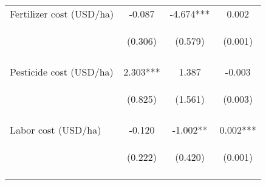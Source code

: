 \begin{center}
\begin{tabular}{lccc}
Fertilizer cost (USD/ha) & -0.087 & -4.674*** & 0.002 \\
 & \begin{footnotesize}(0.306)\end{footnotesize} & \begin{footnotesize}(0.579)\end{footnotesize} & \begin{footnotesize}(0.001)\end{footnotesize} \\
\vspace{4pt} & \begin{footnotesize}[0.777]\end{footnotesize} & \begin{footnotesize}[0.000]\end{footnotesize} & \begin{footnotesize}[0.105]\end{footnotesize} \\
Pesticide cost (USD/ha) & 2.303*** & 1.387 & -0.003 \\
 & \begin{footnotesize}(0.825)\end{footnotesize} & \begin{footnotesize}(1.561)\end{footnotesize} & \begin{footnotesize}(0.003)\end{footnotesize} \\
\vspace{4pt} & \begin{footnotesize}[0.005]\end{footnotesize} & \begin{footnotesize}[0.374]\end{footnotesize} & \begin{footnotesize}[0.344]\end{footnotesize} \\
Labor cost (USD/ha) & -0.120 & -1.002** & 0.002*** \\
 & \begin{footnotesize}(0.222)\end{footnotesize} & \begin{footnotesize}(0.420)\end{footnotesize} & \begin{footnotesize}(0.001)\end{footnotesize} \\
\vspace{4pt} & \begin{footnotesize}[0.589]\end{footnotesize} & \begin{footnotesize}[0.017]\end{footnotesize} & \begin{footnotesize}[0.005]\end{footnotesize} \\

\end{tabular}
\end{center}
